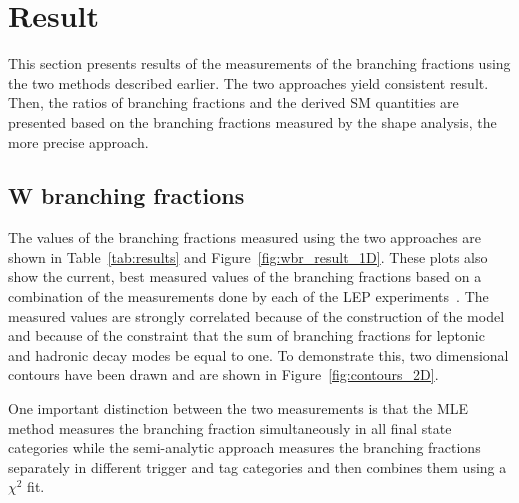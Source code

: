 \section{Result}
\label{sec:analysis:result}


This section presents results of the measurements of the branching
fractions using the two methods described earlier. 
The two approaches yield consistent result.
Then, the ratios of branching
fractions and the derived SM quantities are presented based on the branching
fractions measured by the shape analysis, the more precise approach.


\subsection{W branching fractions}
The values of the
branching fractions measured using the two approaches are shown in
Table~\ref{tab:results} and Figure~\ref{fig:wbr_result_1D}.  These plots
also show the current, best measured values of the \PW branching fractions
based on a combination of the measurements done by each of the LEP
experiments~\cite{Schael:2013ita}.  The measured values are strongly
correlated because of the construction of the model and because of the
constraint that the sum of branching fractions for leptonic and hadronic
decay modes be equal to one.  To demonstrate this, two dimensional
contours have been drawn and are shown in Figure~\ref{fig:contours_2D}.

One important distinction between the two measurements is that the MLE
method measures the branching fraction simultaneously in all final state
categories while the semi-analytic approach measures the branching fractions
separately in different trigger and \PQb tag categories and then combines
them using a $\chi^{2}$ fit.  

